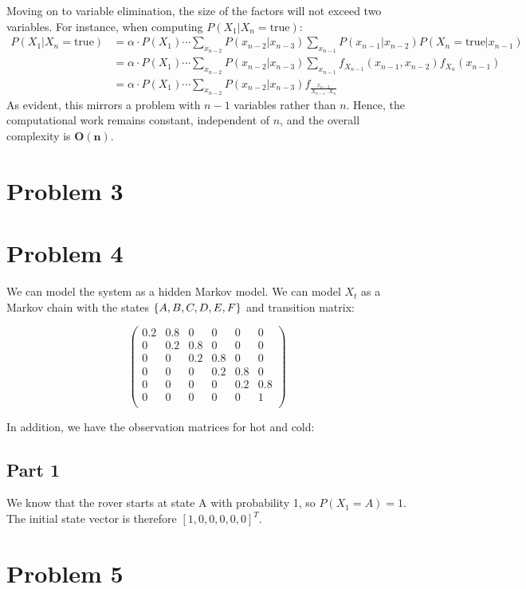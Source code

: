 \documentclass[12pt]{article}
\begin{document}
Moving on to variable elimination, the size of the factors will not exceed two variables. For instance, when computing $P(X_1 | X_n = \text{true})$:
\begin{align*}
P(X_1 | X_n = \text{true})
& = \alpha \cdot P(X_1) \cdots \sum_{x_{n-2}} P(x_{n-2} | x_{n-3}) \sum_{x_{n-1}} P(x_{n-1} | x_{n-2}) P(X_n = \text{true} | x_{n-1}) \\
& = \alpha \cdot P(X_1) \cdots \sum_{x_{n-2}} P(x_{n-2} | x_{n-3}) \sum_{x_{n-1}} f_{X_{n-1}}(x_{n-1}, x_{n-2}) f_{X_n}(x_{n-1}) \\
& = \alpha \cdot P(X_1) \cdots \sum_{x_{n-2}} P(x_{n-2} | x_{n-3}) f_{\frac{x_{n-2}}{X_{n-1} \cdot X_n}}
\end{align*}
As evident, this mirrors a problem with $n-1$ variables rather than $n$. Hence, the computational work remains constant, independent of $n$, and the overall complexity is $\mathbf{O(n)}$.


\section{Problem 3}

\section{Problem 4}

We can model the system as a hidden Markov model.
We can model $X_t$ as a Markov chain with the states $\left \{ A, B, C, D, E, F \right \}$ and transition matrix:

$$
\begin{pmatrix}
0.2 & 0.8 & 0 & 0 & 0 & 0 \\
0 & 0.2 & 0.8 & 0 & 0 & 0 \\
0 & 0 & 0.2 & 0.8 & 0 & 0 \\
0 & 0 & 0 & 0.2 & 0.8 & 0 \\
0 & 0 & 0 & 0 & 0.2 & 0.8 \\
0 & 0 & 0 & 0 & 0 & 1 \\
\end{pmatrix}
$$

In addition,
we have the observation matrices for hot and cold:

\subsection{Part 1}

We know that the rover starts at state A with probability 1,
so $P(X_1 = A) = 1$.
The initial state vector is therefore $[1, 0, 0, 0, 0, 0]^T$.




\section{Problem 5}
\end{document}
